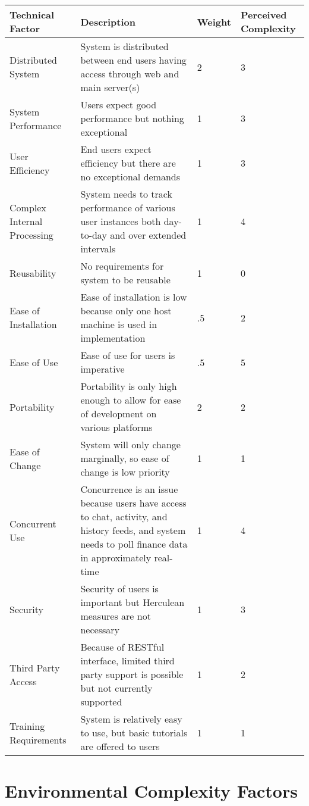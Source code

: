 \renewcommand\arraystretch{2}
\begin{longtable}{|p{1.2in}|p{3.6in}|p{0.5in}|p{.7in}|}
\hline
{\large \color{color1}Technical Factor}&{\large \color{color1}Description}&{\large \color{color1}Weight}&{\large \color{color1}Perceived Complexity} \\ \hline
Distributed System & System is distributed between end users having
access through web and main server(s) & 2 & 3 \\ \hline
System Performance & Users expect good performance but nothing
exceptional & 1 & 3 \\ \hline
User Efficiency & End users expect efficiency but there are no
exceptional demands & 1 & 3 \\ \hline
Complex Internal Processing & System needs to track performance of
various user instances both day-to-day and over extended intervals
& 1 & 4  \\ \hline
Reusability & No requirements for system to be reusable & 1 & 0 \\ \hline
Ease of Installation & Ease of installation is low because only one host machine is used in implementation & .5 & 2 \\ \hline
Ease of Use & Ease of use for users is imperative & .5 & 5 \\ \hline
Portability & Portability is only high enough to allow for ease of development on various platforms & 2 & 2 \\ \hline
Ease of Change & System will only change marginally, so ease of change is low priority & 1 & 1 \\ \hline
Concurrent Use & Concurrence is an issue because users have access to
chat, activity, and history feeds, and system needs to poll finance
data in approximately real-time & 1 & 4 \\ \hline
Security & Security of users is important but Herculean measures are not necessary  & 1 & 3 \\ \hline
Third Party Access & Because of RESTful interface, limited third party support is possible but not currently supported & 1 & 2 \\ \hline
Training Requirements & System is relatively easy to use, but basic
tutorials are offered to users & 1 & 1 \\ \hline
\end{longtable}

\section{Environmental Complexity Factors}

